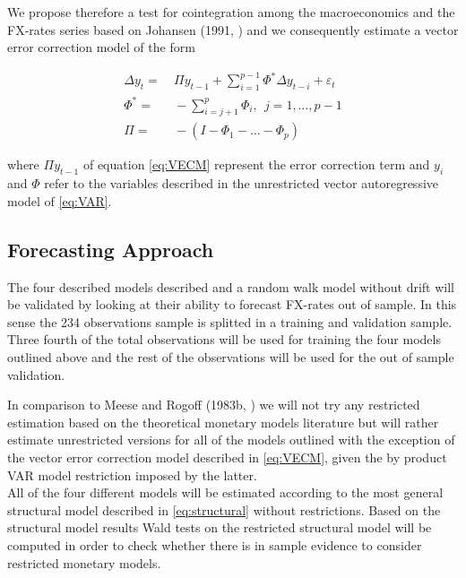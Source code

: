 We propose therefore a test for cointegration among the macroeconomics and the FX-rates series
based on Johansen (1991, \cite{Johansen}) %
and we consequently estimate a vector error correction model of the form

\begin{align}
  \Delta y_t =& \ \Pi y_{t-1} + \sum^{p-1}_{i=1} \Phi^{*} \Delta y_{t-i} + \varepsilon_t \nonumber\\
  \Phi^{*} =& \ - \sum^{p}_{i=j+1} \Phi_i, \ \  j = 1, \dots, p-1 \label{eq:VECM}\\
  \Pi =& \ -(I - \Phi_1 - \dots - \Phi_p) \nonumber\
\end{align}

where $\Pi y_{t-1}$ of equation \ref{eq:VECM} represent the error correction term and $y_i$ and $\Phi$
refer to the variables described in the unrestricted vector autoregressive model of \ref{eq:VAR}.

\subsection{Forecasting Approach}
\label{sub:forecast}
The four described models described and a random walk model without drift will be validated by looking
at their ability to forecast FX-rates out of sample. In this sense the 234 observations sample
is splitted in a training and validation sample. Three fourth of the total observations will
be used for training the four models outlined above and the rest of the observations will be used for the
out of sample validation.

In comparison to Meese and Rogoff
(1983b, \cite{MeeseRogoffb}) we will not try any restricted estimation based on the theoretical
monetary models literature but will rather estimate unrestricted versions for all of the models
outlined with the exception of the vector error correction model described in \ref{eq:VECM}, given
the by product VAR model restriction imposed by the latter.\\
All of the four different models will be estimated according to the most general structural model
described in \ref{eq:structural} without restrictions. Based on the structural model results
Wald tests on the restricted structural model will be computed in order to check whether there
is in sample evidence to consider restricted monetary models. 

